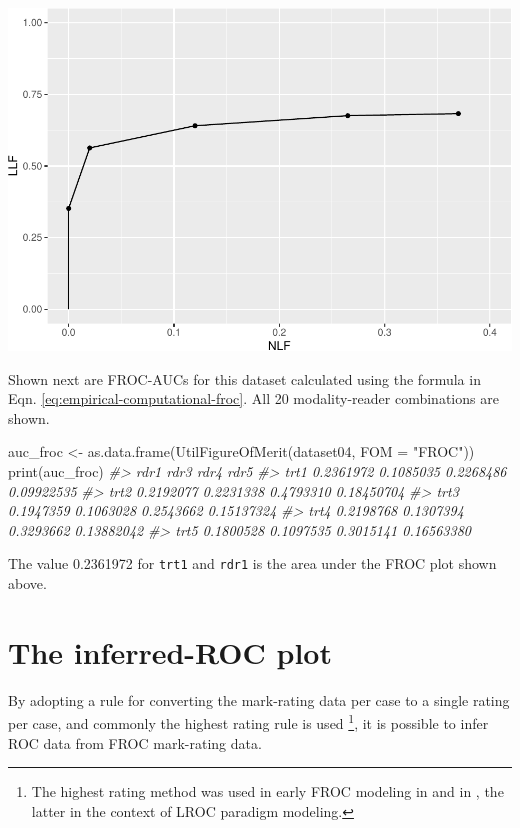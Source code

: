 \documentclass[
]{book}
\newenvironment{Shaded}{\begin{snugshade}}{\end{snugshade}}
\newcommand{\AttributeTok}[1]{\textcolor[rgb]{0.77,0.63,0.00}{#1}}
\newcommand{\CommentTok}[1]{\textcolor[rgb]{0.56,0.35,0.01}{\textit{#1}}}
\newcommand{\FunctionTok}[1]{\textcolor[rgb]{0.00,0.00,0.00}{#1}}
\newcommand{\NormalTok}[1]{#1}
\newcommand{\OtherTok}[1]{\textcolor[rgb]{0.56,0.35,0.01}{#1}}
\newcommand{\StringTok}[1]{\textcolor[rgb]{0.31,0.60,0.02}{#1}}
\begin{document}
\includegraphics{03-empirical_files/figure-latex/unnamed-chunk-1-1.pdf}

Shown next are FROC-AUCs for this dataset calculated using the formula in Eqn. \eqref{eq:empirical-computational-froc}. All 20 modality-reader combinations are shown.

\begin{Shaded}
\begin{Highlighting}[]
\NormalTok{auc\_froc }\OtherTok{\textless{}{-}} \FunctionTok{as.data.frame}\NormalTok{(}\FunctionTok{UtilFigureOfMerit}\NormalTok{(dataset04, }\AttributeTok{FOM =} \StringTok{"FROC"}\NormalTok{))}
\FunctionTok{print}\NormalTok{(auc\_froc)}
\CommentTok{\#\textgreater{}           rdr1      rdr3      rdr4       rdr5}
\CommentTok{\#\textgreater{} trt1 0.2361972 0.1085035 0.2268486 0.09922535}
\CommentTok{\#\textgreater{} trt2 0.2192077 0.2231338 0.4793310 0.18450704}
\CommentTok{\#\textgreater{} trt3 0.1947359 0.1063028 0.2543662 0.15137324}
\CommentTok{\#\textgreater{} trt4 0.2198768 0.1307394 0.3293662 0.13882042}
\CommentTok{\#\textgreater{} trt5 0.1800528 0.1097535 0.3015141 0.16563380}
\end{Highlighting}
\end{Shaded}

The value 0.2361972 for \texttt{trt1} and \texttt{rdr1} is the area under the FROC plot shown above.

\hypertarget{empirical-ROC}{%
\section{The inferred-ROC plot}\label{empirical-ROC}}

By adopting a rule for converting the mark-rating data per case to a single rating per case, and commonly the highest rating rule is used \footnote{The highest rating method was used in early FROC modeling in \citep{bunch1977free} and in \citep{swensson1996unified}, the latter in the context of LROC paradigm modeling.}, it is possible to infer ROC data from FROC mark-rating data.
\end{document}
